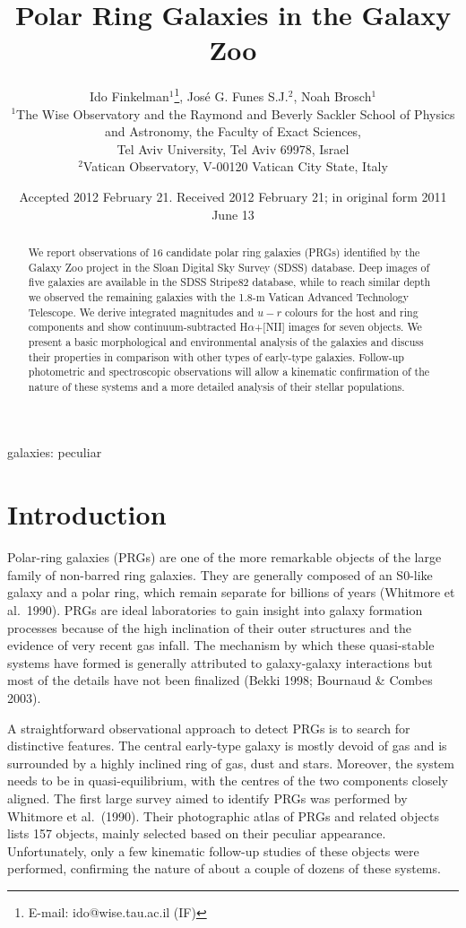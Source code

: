 \documentclass[useAMS,usenatbib]{mn2e}
\title[Polar Ring Galaxies in the Galaxy Zoo]{Polar Ring Galaxies in the Galaxy Zoo}
\author[Ido Finkelman et al.]{Ido Finkelman$^{1}$\thanks{E-mail: ido@wise.tau.ac.il (IF)}, Jos\'{e} G. Funes S.J.$^{2}$, Noah Brosch$^{1}$\\
$^{1}$The Wise Observatory and the Raymond and  Beverly Sackler School of Physics and
Astronomy, the Faculty of Exact
Sciences, \\ Tel Aviv University, Tel Aviv 69978, Israel\\
$^{2}$Vatican Observatory, V-00120 Vatican City State, Italy
}
\begin{document}
\date{Accepted 2012 February 21.  Received 2012 February 21; in original form 2011 June 13}

\pagerange{\pageref{firstpage}--\pageref{lastpage}} 

\maketitle

\label{firstpage}

\begin{abstract}
We report observations of 16 candidate polar ring galaxies (PRGs) identified by the Galaxy Zoo project in the Sloan Digital Sky Survey (SDSS) database. Deep images of five galaxies are available in the SDSS Stripe82 database, while to reach similar depth we observed the remaining galaxies with the 1.8-m Vatican Advanced Technology Telescope.
We derive integrated magnitudes and $u-r$ colours for the host and ring components and show continuum-subtracted H$\alpha$+[NII] images for seven objects. 
We present a basic morphological and environmental analysis of the galaxies and discuss their properties in comparison with other types of early-type galaxies.
Follow-up photometric and spectroscopic observations will allow a kinematic confirmation of the nature of these systems and a more detailed analysis of their stellar populations.

\end{abstract}

\begin{keywords}
galaxies: peculiar
\end{keywords}

\section{Introduction}
Polar-ring galaxies (PRGs) are one of the more remarkable objects of the large family of non-barred ring
galaxies. They are generally composed of an S0-like galaxy and a polar ring, which remain separate for
billions of years (Whitmore et al.\ 1990). 
PRGs are ideal laboratories to gain insight into galaxy formation processes because of the high inclination of their outer structures and the evidence of very recent gas infall. The mechanism by which these quasi-stable systems have formed is generally attributed
to galaxy-galaxy interactions but most of the details have not been finalized (Bekki 1998; Bournaud \& Combes 2003).

A straightforward observational approach to detect PRGs is to search for distinctive features.
The central early-type galaxy is mostly devoid of gas and is surrounded by a highly inclined ring of gas, dust and stars.
Moreover, the system needs to be in quasi-equilibrium, with the centres of the two components closely aligned. 
The first large survey aimed to identify PRGs was performed by Whitmore et al.\ (1990). Their photographic atlas of PRGs and related objects lists 157 objects, mainly selected based on their peculiar appearance.
Unfortunately, only a few kinematic follow-up studies of these objects were performed, confirming the nature of about a couple of dozens of these systems.    
\end{document}
